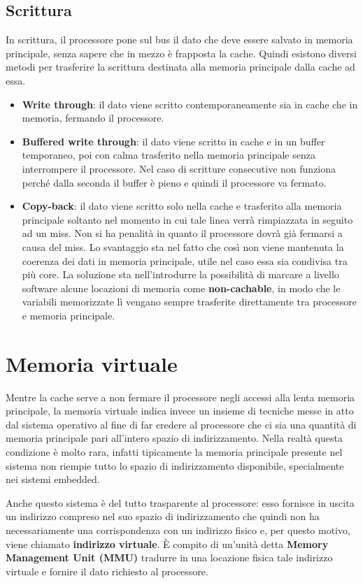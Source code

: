 \documentclass[11pt,4paper]{report}
\begin{document}
\subsection{Scrittura}
In scrittura, il processore pone sul bus il dato che deve essere salvato in memoria principale, senza sapere che in mezzo è frapposta la cache. Quindi esistono diversi metodi per trasferire la scrittura destinata alla memoria principale dalla cache ad essa.
\begin{itemize}
\item \textbf{Write through}: il dato viene scritto contemporaneamente sia in cache che in memoria, fermando il processore.
\item \textbf{Buffered write through}: il dato viene scritto in cache e in un buffer temporaneo, poi con calma trasferito nella memoria principale senza interrompere il processore. Nel caso di scritture consecutive non funziona perché dalla seconda il buffer è pieno e quindi il processore va fermato.
\item \textbf{Copy-back}: il dato viene scritto solo nella cache e trasferito alla memoria principale soltanto nel momento in cui tale linea verrà rimpiazzata in seguito ad un miss. Non si ha penalità in quanto il processore dovrà già fermarsi a causa del miss. Lo svantaggio sta nel fatto che così non viene mantenuta la coerenza dei dati in memoria principale, utile nel caso essa sia condivisa tra più core. La soluzione sta nell'introdurre la possibilità di marcare a livello software alcune locazioni di memoria come \textbf{non-cachable}, in modo che le variabili memorizzate lì vengano sempre trasferite direttamente tra processore e memoria principale.
\end{itemize}

\section{Memoria virtuale}
Mentre la cache serve a non fermare il processore negli accessi alla lenta memoria principale, la memoria virtuale indica invece un insieme di tecniche messe in atto dal sistema operativo al fine di far credere al processore che ci sia una quantità di memoria principale pari all'intero spazio di indirizzamento. Nella realtà questa condizione è molto rara, infatti tipicamente la memoria principale presente nel sistema non riempie tutto lo spazio di indirizzamento disponibile, specialmente nei sistemi embedded.

Anche questo sistema è del tutto trasparente al processore: esso fornisce in uscita un indirizzo compreso nel suo spazio di indirizzamento che quindi non ha necessariamente una corrispondenza con un indirizzo fisico e, per questo motivo, viene chiamato \textbf{indirizzo virtuale}. È compito di un'unità detta \textbf{Memory Management Unit (MMU)} tradurre in una locazione fisica tale indirizzo virtuale e fornire il dato richiesto al processore.
\end{document}
